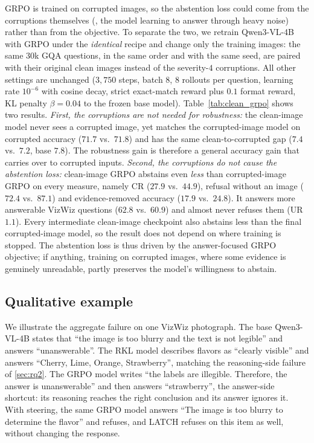 GRPO is trained on corrupted images, so the abstention loss could come from the
corruptions themselves (\eg, the model learning to answer through heavy noise) rather than
from the objective. To separate the two, we retrain Qwen3-VL-4B with GRPO under the
\emph{identical} recipe and change only the training images: the same $30$k GQA questions,
in the same order and with the same seed, are paired with their original clean images
instead of the severity-$4$ corruptions. All other settings are unchanged ($3{,}750$ steps,
batch $8$, $8$ rollouts per question, learning rate $10^{-6}$ with cosine decay, strict
exact-match reward plus $0.1$ format reward, KL penalty $\beta{=}0.04$ to the frozen base
model). Table~\ref{tab:clean_grpo} shows two results. \emph{First, the corruptions are not
needed for robustness:} the clean-image model never sees a corrupted image, yet matches the
corrupted-image model on corrupted accuracy ($71.7$ vs.\ $71.8$) and has the same
clean-to-corrupted gap ($7.4$ vs.\ $7.2$, base $7.8$). The robustness gain is therefore a
general accuracy gain that carries over to corrupted inputs. \emph{Second, the corruptions
do not cause the abstention loss:} clean-image GRPO abstains even \emph{less} than
corrupted-image GRPO on every measure, namely CR ($27.9$ vs.\ $44.9$), refusal without an
image ($72.4$ vs.\ $87.1$) and evidence-removed accuracy ($17.9$ vs.\ $24.8$). It answers
more answerable VizWiz questions ($62.8$ vs.\ $60.9$) and almost never refuses them (UR
$1.1$). Every intermediate clean-image checkpoint also abstains less than the final
corrupted-image model, so the result does not depend on where training is stopped.
The abstention loss is thus driven by the answer-focused GRPO objective;
if anything, training on corrupted images, where some evidence is genuinely unreadable,
partly preserves the model's willingness to abstain.


\subsection{Qualitative example}
\label{sec:qualitative}

We illustrate the aggregate failure on one VizWiz photograph. The base
Qwen3-VL-4B states that ``the image is too blurry and the text is not legible'' and answers
``unanswerable''. The RKL model describes flavors as ``clearly visible'' and answers
``Cherry, Lime, Orange, Strawberry'', matching the reasoning-side failure of \cref{sec:rq2}.
The GRPO model writes ``the labels are illegible. Therefore, the answer is unanswerable''
and then answers ``strawberry'', the answer-side shortcut: its reasoning reaches the right
conclusion and its answer ignores it. With steering, the same GRPO model answers ``The image
is too blurry to determine the flavor'' and refuses, and LATCH refuses on this item as
well, without changing the response.
